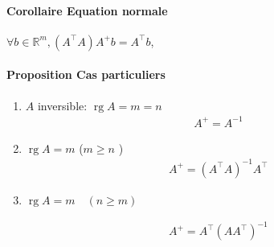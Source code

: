 \documentclass{article}
\newcommand{\rg}{\operatorname{rg}}
\newcommand{\R}{\mathbb{R}}
\newenvironment{corollary}[1][\unskip]{
	\paragraph{Corollaire #1}

}{}
\newenvironment{proposition}[1][\unskip]{
	\paragraph{Proposition #1}

}{}
\begin{document}
\begin{corollary}[Equation normale]
    $\forall b\in \R^m, (A^\top A) A^+ b = A^\top b$, 
\end{corollary}

\begin{proposition}[Cas particuliers]
   \begin{enumerate}
       \item $A$ inversible:  $\rg A = m = n$
           \begin{align*}
               A^+ = A^{-1}
           \end{align*}

        \item $\rg A = m$ ($m \ge n$ )
            \begin{align*}
                A^+ = (A^\top A)^{-1} A^\top 
            \end{align*}

        \item $\rg A = m \quad (n\ge m)$

            \begin{align*}
                A^+ = A^\top (A A^\top )^{-1}
            \end{align*}
   \end{enumerate} 
\end{proposition}
\end{document}
